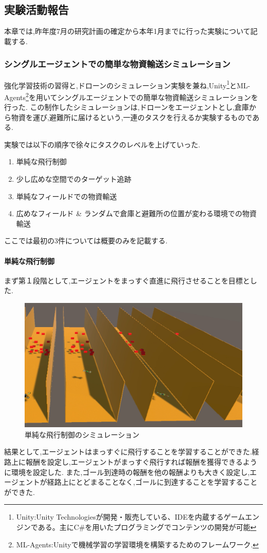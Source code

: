 \documentclass{article}[jsarticle]
\begin{document}
\subsection{実験活動報告}
本章では,昨年度7月の研究計画の確定から本年1月までに行った実験について記載する.
\subsubsection{シングルエージェントでの簡単な物資輸送シミュレーション}
強化学習技術の習得と,ドローンのシミュレーション実験を兼ね,Unity\footnote{Unity:Unity Technologiesが開発・販売している、IDEを内蔵するゲームエンジンである。主にC\#を用いたプログラミングでコンテンツの開発が可能}とML-Agents\footnote{ML-Agents:Unityで機械学習の学習環境を構築するためのフレームワーク.}を用いてシングルエージェントでの簡単な物資輸送シミュレーションを行った.
この制作したシミュレーションは,ドローンをエージェントとし,倉庫から物資を運び,避難所に届けるという,一連のタスクを行えるか実験するものである.\par 
実験では以下の順序で徐々にタスクのレベルを上げていった.
\begin{enumerate}
    \item 単純な飛行制御
    \item 少し広めな空間でのターゲット追跡
    \item 単純なフィールドでの物資輸送
    \item 広めなフィールド \& ランダムで倉庫と避難所の位置が変わる環境での物資輸送
\end{enumerate}
ここでは最初の3件については概要のみを記載する.
\paragraph{単純な飛行制御}まず第１段階として,エージェントをまっすぐ直進に飛行させることを目標とした.
\begin{figure}[H]
    \centering
    \includegraphics[width=\textwidth]{./Images/2024023215400.png}
    \captionsetup{justification=centering}
    \caption{単純な飛行制御のシミュレーション}
\end{figure}
結果として,エージェントはまっすぐに飛行することを学習することができた.経路上に報酬を設定し,エージェントがまっすぐ飛行すれば報酬を獲得できるように環境を設定した.
また,ゴール到達時の報酬を他の報酬よりも大きく設定し,エージェントが経路上にとどまることなく,ゴールに到達することを学習することができた.
\end{document}
